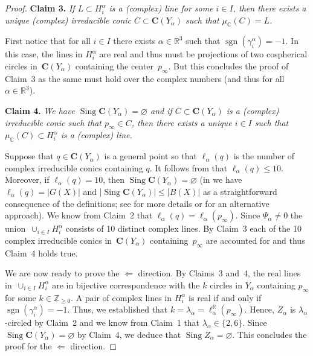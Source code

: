 \documentclass[11pt]{article}
\newcommand{\C}{\mathbb{C}}
\newcommand{\R}{\mathbb{R}}
\newcommand{\Z}{\mathbb{Z}}
\newcommand{\bC}{\mathbf{C}}
\newcommand{\Sing}{\operatorname{Sing}}
\newcommand{\sgn}{\operatorname{sgn}}
\newcommand{\st}{such that }
\begin{document}
\begin{proof}
{\bf Claim 3.} {\it
If $L\subset H^\alpha_i$ is a (complex) line for some $i\in I$,
then there exists a unique (complex) irreducible conic $C\subset\bC(Y_\alpha)$
\st $\mu_\C(C)=L$.}

First notice that for all $i\in I$
there exists $\alpha\in\R^3$ \st $\sgn(\gamma^\alpha_i)=-1$.
In this case, the lines in $H^\alpha_i$ are real
and thus must be projections of two cospherical circles in~$\bC(Y_\alpha)$
containing the center~$p_\infty$.
But this concludes the proof of Claim~3 as the same must hold over the complex numbers
(and thus for all $\alpha\in\R^3$).


{\bf Claim 4.} {\it
We have $\Sing \bC(Y_\alpha)=\varnothing$ and
if $C\subset\bC(Y_\alpha)$ is a (complex) irreducible conic \st $p_\infty\in C$,
then there exists a unique $i\in I$ \st $\mu_\C(C)\subset H^\alpha_i$
is a (complex) line.}

Suppose that $q\in\bC(Y_\alpha)$ is a general point
so that $\ell_\alpha(q)$ is the number of complex irreducible conics containing $q$.
It follows from \citep[Corollary~6]{2021circ} that $\ell_\alpha(q)\leq 10$.
Moreover, if $\ell_\alpha(q)=10$, then $\Sing\bC(Y_\alpha)=\varnothing$
(in \citep[Table~6]{2021circ} we have $\ell_\alpha(q)=|G(X)|$ and $|\Sing\bC(Y_\alpha)|\leq |B(X)|$
as a straightforward consequence of the definitions; see \citep[]{2023trans} for more details
or \citep[]{2012web} for an alternative approach).
We know from Claim~2 that $\ell_\alpha(q)=\ell_\alpha(p_\infty)$.
Since $\Psi_\alpha\neq 0$ the union~$\cup_{i\in I} H^\alpha_i$ consists of 10 distinct complex lines.
By Claim~3 each of the 10 complex irreducible conics in~$\bC(Y_\alpha)$ containing~$p_\infty$ are accounted for
and thus Claim~4 holds true.

We are now ready to prove the $\Leftarrow$ direction.
By Claims~3 and~4, the real lines in~$\cup_{i\in I} H^\alpha_i$
are in bijective correspondence with the $k$ circles in $Y_\alpha$ containing $p_\infty$ for some $k\in\Z_{\geq 0}$.
A pair of complex lines in $H^\alpha_i$ is real if and only if $\sgn(\gamma^\alpha_i)=-1$.
Thus, we established that $k=\lambda_\alpha=\ell_\alpha^\R(p_\infty)$.
Hence, $Z_\alpha$ is $\lambda_\alpha$-circled by Claim~2
and we know from Claim~1 that $\lambda_\alpha\in\{2,6\}$.
Since $\Sing\bC(Y_\alpha)=\varnothing$ by Claim~4, we deduce that $\Sing Z_\alpha=\varnothing$.
This concludes the proof for the $\Leftarrow$ direction.


\end{proof}
\end{document}
